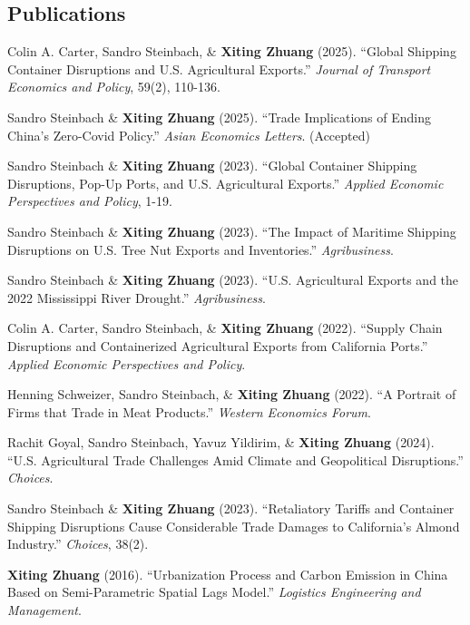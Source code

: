 \documentclass[10.5pt,letterpaper]{article}
\renewenvironment{itemize}{
	\begin{list}{}{
			\setlength{\leftmargin}{1.5em}
		}
	}{
	\end{list}
}
\begin{document}
	\subsection*{\textbf{Publications}}
	\begin{itemize}
		\item[-] Colin A. Carter, Sandro Steinbach, \& \textbf{Xiting Zhuang} (2025).  
		``Global Shipping Container Disruptions and U.S. Agricultural Exports.''  
		\textit{Journal of Transport Economics and Policy}, 59(2), 110-136.  
		
		\item[-] Sandro Steinbach \& \textbf{Xiting Zhuang} (2025).  
		``Trade Implications of Ending China’s Zero-Covid Policy.''  
		\textit{Asian Economics Letters}. (Accepted)
		
		\item[-] Sandro Steinbach \& \textbf{Xiting Zhuang} (2023).  
		``Global Container Shipping Disruptions, Pop-Up Ports, and U.S. Agricultural Exports.''  
		\textit{Applied Economic Perspectives and Policy}, 1-19.
		
		\item[-] Sandro Steinbach \& \textbf{Xiting Zhuang} (2023).  
		``The Impact of Maritime Shipping Disruptions on U.S. Tree Nut Exports and Inventories.''  
		\textit{Agribusiness}.
		
		\item[-] Sandro Steinbach \& \textbf{Xiting Zhuang} (2023).  
		``U.S. Agricultural Exports and the 2022 Mississippi River Drought.''  
		\textit{Agribusiness}.
		
		\item[-] Colin A. Carter, Sandro Steinbach, \& \textbf{Xiting Zhuang} (2022).  
		``Supply Chain Disruptions and Containerized Agricultural Exports from California Ports.''  
		\textit{Applied Economic Perspectives and Policy}.
		
		\item[-] Henning Schweizer, Sandro Steinbach, \& \textbf{Xiting Zhuang} (2022).  
		``A Portrait of Firms that Trade in Meat Products.''  
		\textit{Western Economics Forum}.
		
		\item[-] Rachit Goyal, Sandro Steinbach, Yavuz Yildirim, \& \textbf{Xiting Zhuang} (2024).  
		``U.S. Agricultural Trade Challenges Amid Climate and Geopolitical Disruptions.''  
		\textit{Choices}.
		
		\item[-] Sandro Steinbach \& \textbf{Xiting Zhuang} (2023).  
		``Retaliatory Tariffs and Container Shipping Disruptions Cause Considerable Trade Damages to California’s Almond Industry.''  
		\textit{Choices}, 38(2).
		
		\item[-] \textbf{Xiting Zhuang} (2016).  
		``Urbanization Process and Carbon Emission in China Based on Semi-Parametric Spatial Lags Model.''  
		\textit{Logistics Engineering and Management}.
	\end{itemize}
	
\end{document}
